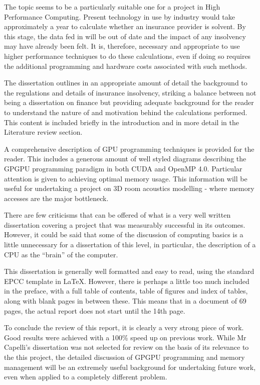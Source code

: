 \documentclass[a4paper,12pt]{article}
\begin{document}
The topic seems to be a particularly suitable one for a project in High Performance Computing. Present technology in use by industry would take approximately a year to calculate whether an insurance provider is solvent. By this stage, the data fed in will be out of date and the impact of any insolvency may have already been felt. It is, therefore, necessary and appropriate to use higher performance techniques to do these calculations, even if doing so requires the additional programming and hardware costs associated with such methods.

The dissertation outlines in an appropriate amount of detail the background to the regulations and details of insurance insolvency, striking a balance between not being a dissertation on finance but providing adequate background for the reader to understand the nature of and motivation behind the calculations performed. This content is included briefly in the introduction and in more detail in the Literature review section.

A comprehensive description of GPU programming techniques is provided for the reader. This includes a generous amount of well styled diagrams describing the GPGPU programming paradigm in both CUDA and OpenMP 4.0. Particular attention is given to achieving optimal memory usage. This information will be useful for undertaking a project on 3D room acoustics modelling - where memory accesses are the major bottleneck.

There are few criticisms that can be offered of what is a very well written dissertation covering a project that was measurably successful in its outcomes. However, it could be said that some of the discussion of computing basics is a little unnecessary for a dissertation of this level, in particular, the description of a CPU as the ``brain'' of the computer.
 
This dissertation is generally well formatted and easy to read, using the standard EPCC template  in \LaTeX . However, there is perhaps a little too much included in the preface, with a full table of contents, table of figures and index of tables, along with blank pages in between these. This means that in a document of 69 pages, the actual report does not start until the 14th page.

To conclude the review of this report, it is clearly a very strong piece of work. Good results were achieved with a 100\% speed up on previous work. While Mr Capelli's dissertation was not selected for review on the basis of its relevance to the this project, the detailed discussion of GPGPU programming and memory management will be an extremely useful background for undertaking future work, even when applied to a completely different problem.
\end{document}
